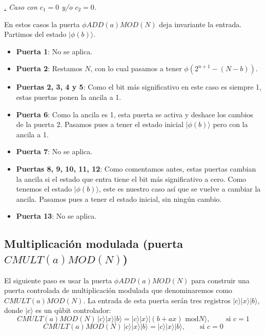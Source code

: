 \documentclass[a4paper,11pt]{book} %
\numberwithin{equation}{chapter}
\def\subsubiContadorIt{\par\addtocounter{subsubsection}{1}\underline{\it\thesubsubsection.}\hskip0.5cm \setcounter{subsubsubsectionIt}{0}}
\newcommand{\SubsubiIt}[1]{
		\subsubiContadorIt \textit{#1}
	}
\newcounter{subsubsubsectionIt}[subsubsection]
\begin{document}
		\SubsubiIt{Caso con $c_1 = 0$ y/o $c_2 = 0$.}
		
En estos casos la puerta $\phi ADD(a)MOD(N)$ deja invariante la entrada. Partimos del estado $| \phi(b) \rangle$.

\begin{itemize}
	\item \textbf{Puerta 1}: No se aplica. 

	\item \textbf{Puerta 2}: Restamos $N$, con lo cual pasamos a tener $\phi \left( 2^{n+1} - (N-b) \right)$.

	\item \textbf{Puertas 2, 3, 4 y 5}: Como el bit más significativo en este caso es siempre 1, estas puertas ponen la ancila a 1.

	\item \textbf{Puerta 6}: Como la ancila es 1, esta puerta se activa y deshace los cambios de la puerta 2. Pasamos pues a tener el estado inicial $| \phi(b) \rangle$ pero con la ancila a 1.

	\item \textbf{Puerta 7}: No se aplica.

	\item \textbf{Puertas 8, 9, 10, 11, 12}: Como comentamos antes, estas puertas cambian la ancila si el estado que entra tiene el bit más significativo a cero. Como tenemos el estado $| \phi(b) \rangle$, este es nuestro caso así que se vuelve a cambiar la ancila. Pasamos pues a tener el estado inicial, sin ningún cambio.

	\item \textbf{Puerta 13}: No se aplica.		 

\end{itemize}

\subsection{Multiplicación modulada (puerta $CMULT(a)MOD(N)$)} \label{sec_2n+3-Puerta-CMULT(a)MOD(N)}

El siguiente paso es usar la puerta $\phi ADD(a)MOD(N)$ para construir una 
puerta controlada de multiplicación modulada que denominaremos como $CMULT(a)MOD(N)$. La entrada de esta puerta serán tres registros $|c \rangle |x \rangle |b  \rangle$, donde $|c \rangle$ es un qúbit controlador:
		\begin{equation}
		\boxed{CMULT(a)MOD(N) \, |c \rangle |x \rangle |b \rangle = |c \rangle |x \rangle | (b + a x) \text{ mod} N \rangle, \qquad \, \text{si }   c = 1}
		\end{equation} 
\begin{equation}
CMULT(a)MOD(N) \, |c \rangle |x \rangle |b \rangle = |c \rangle |x \rangle | b \rangle, \qquad  \text{si }  c = 0
\end{equation}
 
\end{document}
